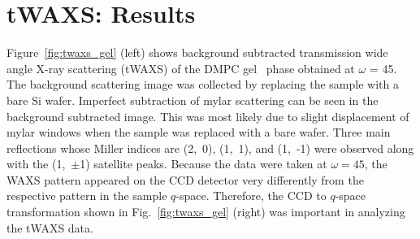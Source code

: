 \section{tWAXS: Results}\label{sec:tWAXS_results}
Figure~\ref{fig:twaxs_gel} (left) shows background subtracted transmission wide
angle X-ray scattering (tWAXS) of the DMPC gel \LbetaI\ phase obtained at 
$\omega$ = 45\textdegree.
The background scattering image was collected by replacing 
the sample with a bare Si wafer. Imperfect subtraction of mylar scattering 
can be seen in the background subtracted image. 
This was most likely due to slight displacement of mylar windows
when the sample was replaced with a bare wafer. 
Three main reflections whose Miller indices 
are (2,~0), (1,~1), and (1,~-1) were observed along with the (1,~$\pm$1) satellite 
peaks.
Because the data were taken at $\omega=45$\textdegree, the WAXS pattern 
appeared on the CCD detector very differently from the respective pattern
in the sample $q$-space. 
Therefore, the CCD to $q$-space transformation shown in 
Fig.~\ref{fig:twaxs_gel} (right) was important in analyzing the tWAXS data. 

